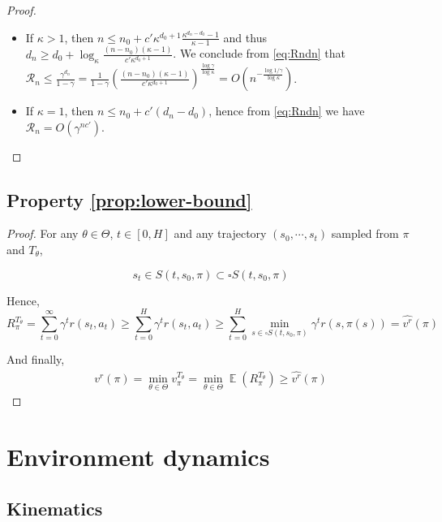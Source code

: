 \documentclass{article}
\DeclareMathOperator*{\E}{\mathbb{E}}
\begin{document}
\begin{proof}
\begin{itemize}
    \item If $\kappa > 1$, then $n \leq n_0 + c'\kappa^{d_0+1}\frac{\kappa^{d_n-d_0}-1}{\kappa-1}$ and thus $d_n \geq d_0 + \log_\kappa \frac{(n-n_0)(\kappa - 1)}{c'\kappa^{d_0+1}}$.
We conclude from \eqref{eq:Rndn} that $\mathcal{R}_n \leq \frac{\gamma^{d_n}}{1-\gamma} = \frac{1}{1-\gamma} \left( \frac{(n-n_0)(\kappa - 1)}{c'\kappa^{d_0+1}} \right)^\frac{\log \gamma}{\log \kappa} = O\left(n^{-\frac{\log 1/\gamma}{\log \kappa}}\right)$.

\item If $\kappa = 1$, then $n \leq n_0 + c'(d_n-d_0)$, hence from \eqref{eq:Rndn} we have $\mathcal{R}_n = O\left(\gamma^{nc'}\right)$.
\end{itemize}
\end{proof}

\subsection{Property \ref{prop:lower-bound}}
\label{appendix:proof-prop}

\begin{proof}
For any $\theta \in \Theta$, $t \in [0, H]$ and any trajectory $(s_0, \cdots, s_t)$ sampled from $\pi$ and $T_\theta$,

\begin{equation*}
s_t \in S(t, s_0, \pi) \subset \square S(t, s_0, \pi)
\end{equation*}

Hence, 
\begin{equation*}
R^{T_\theta}_\pi = \sum_{t=0}^\infty \gamma^t r(s_t, a_t) \geq \sum_{t=0}^H \gamma^t r(s_t, a_t) \geq \sum_{t=0}^H \min_{s\in \square S(t, s_0, \pi)} \gamma^t r(s, \pi(s)) = \hat{v^r}(\pi)
\end{equation*}

And finally,
\begin{align*}
v^r(\pi) = \min_{\theta\in\Theta} {v_\pi^{T_\theta}} = \min_{\theta\in\Theta} \E(R^{T_\theta}_\pi) \geq \hat{v^r}(\pi)
\end{align*}
\end{proof}

\section{Environment dynamics}
	
\subsection{Kinematics}
\end{document}
